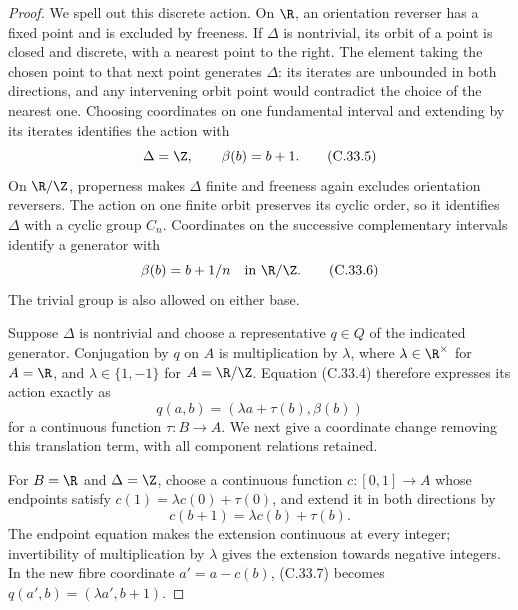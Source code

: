 \begin{proof}
We spell out this discrete action. On $\R$, an orientation
reverser has a fixed point and is excluded by freeness.
If $\Delta$ is nontrivial, its orbit of a point is closed and
discrete, with a nearest point to the right. The element
taking the chosen point to that next point generates
$\Delta$: its iterates are unbounded in both directions, and
any intervening orbit point would contradict the choice of
the nearest one. Choosing coordinates on one fundamental
interval and extending by its iterates identifies the action
with
\[
                   \Delta=\Z,\qquad \beta(b)=b+1.
                                                        \tag{C.33.5}
\]
On $\R/\Z$, properness makes $\Delta$ finite and freeness
again excludes orientation reversers. The action on one
finite orbit preserves its cyclic order, so it identifies
$\Delta$ with a cyclic group $C_n$. Coordinates on the
successive complementary intervals identify a generator
with
\[
                   \beta(b)=b+1/n\quad\text{in }\R/\Z.
                                                        \tag{C.33.6}
\]
The trivial group is also allowed on either base.

Suppose $\Delta$ is nontrivial and choose a representative
$q\in Q$ of the indicated generator. Conjugation by $q$ on
$A$ is multiplication by $\lambda$, where
$\lambda\in\R^\times$ for $A=\R$, and
$\lambda\in\{1,-1\}$ for $A=\R/\Z$.
Equation (C.33.4) therefore expresses its action exactly as
\[
                 q(a,b)=(\lambda a+\tau(b),\beta(b))
                                                        \tag{C.33.7}
\]
for a continuous function $\tau:B\to A$.
We next give a coordinate change removing this translation
term, with all component relations retained.

For $B=\R$ and $\Delta=\Z$, choose a continuous function
$c:[0,1]\to A$ whose endpoints satisfy
$c(1)=\lambda c(0)+\tau(0)$, and extend it in both directions
by
\[
                      c(b+1)=\lambda c(b)+\tau(b).
                                                        \tag{C.33.8}
\]
The endpoint equation makes the extension continuous at every
integer; invertibility of multiplication by $\lambda$ gives
the extension towards negative integers. In the new fibre
coordinate $a'=a-c(b)$, (C.33.7) becomes
$q(a',b)=(\lambda a',b+1)$.


\end{proof}
